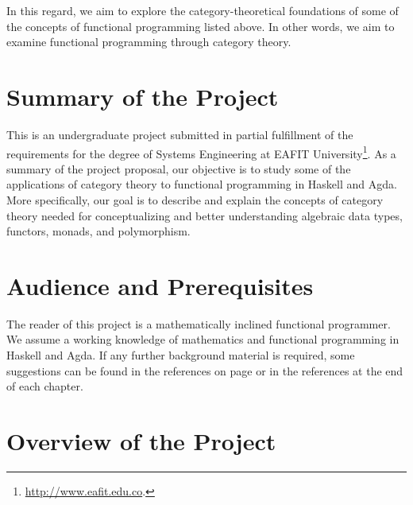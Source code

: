 In this regard, we aim to explore the category-theoretical foundations
of some of the concepts of functional programming listed above. In
other words, we aim to examine functional programming through category
theory.

\section{Summary of the Project}
\label{sec:introduction-summary}

This is an undergraduate project submitted in partial fulfillment of
the requirements for the degree of Systems Engineering at EAFIT
University\footnote{\url{http://www.eafit.edu.co}.}. As a summary of
the project proposal, our objective is to study some of the
applications of category theory to functional programming in Haskell
and Agda. More specifically, our goal is to describe and explain the
concepts of category theory needed for conceptualizing and better
understanding algebraic data types, functors, monads, and
polymorphism.

\section{Audience and Prerequisites}
\label{sec:introduction-prerequisites}

The reader of this project is a mathematically inclined functional
programmer. We assume a working knowledge of mathematics and
functional programming in Haskell and Agda. If any further background
material is required, some suggestions can be found in the references
on page \pageref{sec:introduction-references} or in the references at
the end of each chapter.

\section{Overview of the Project}
\label{sec:introduction-overview}

